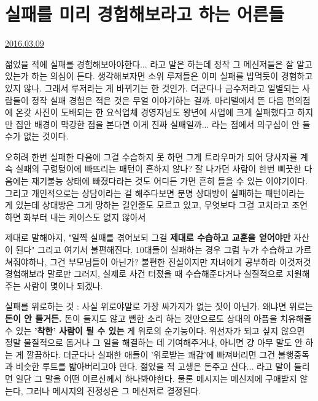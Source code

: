 \section{실패를 미리 경험해보라고 하는 어른들}
\href{https://www.kockoc.com/Apoc/670071}{2016.03.09}

\vspace{5mm}

젊었을 적에 실패를 경험해보아야한다... 라고 말은 하는데 정작 그 메신저들은 잘 알고 있는가 하는 의심이 든다.
생각해보자면 소위 루저들은 이미 실패를 밥먹듯이 경험하고 있지 않나.  그래서 루저라는 게 바뀌기는 한 것인가.
더군다나 금수저라고 일별되는 사람들이 정작 실패 경험은 적은 것은 무얼 이야기하는 걸까.
마리텔에서 뜬 다음 편의점에 온갖 사진이 도배되는 한 요식업체 경영자님도
왕년에 사업에 크게 실패했다고 하지만 집안 배경이 막강한 점을 본다면 이게 진짜 실패일까... 라는 점에서 의구심이 안 들 수가 없는 것이다.
\vspace{5mm}

오히려 한번 실패한 다음에 그걸 수습하지 못 하면 그게 트라우마가 되어 당사자를 계속 실패의 구렁텅이에 빠뜨리는 패턴이 흔하지 않나?
잘 나가던 사람이 한번 삐끗한 다음에는 재기불능 상태에 빠졌다라는 것도 어디든 가면 흔히 들을 수 있는 이야기이다.
그리고 개인적으로는 상담이라는 걸 해주다보면 분명 상대방이 실패하는 패턴이라는 게 있는데
상대방은 그게 망하는 길인줄도 모르고 있고, 무엇보다 그걸 고치라고 조언하면 화부터 내는 케이스도 없지 않아서
\vspace{5mm}

제대로 말해야지, "일찍 실패를 겪어보되 그걸 \textbf{제대로 수습하고 교훈을 얻어야만} 자산이 된다"
그리고 여기서 불편해진다. 10대들이 실패하는 경우 그럼 누가 수습하고 가르쳐줘야하나, 그건 부모님들이 아닌가?
불편한 진실이지만 자녀에게 공부하라 이것저것 경험해보라 말로만 그러지, 실제로 사건 터졌을 때 수습해준다거나
실질적으로 지원해주는 사람이 몇이나 되겠나.
\vspace{5mm}

실패를 위로하는 것 : 사실 위로야말로 가장 싸가지가 없는 짓이 아닌가. 왜냐면 위로는 \textbf{돈이 안 들거든.}
돈이 들지도 않고 뻔한 소리 하는 것만으로도 상대의 아픔을 치유해줄 수 있는 \textbf{'착한' 사람이 될 수 있는} 게 위로의 순기능이다.
위선자가 되고 싶지 않으면 정말 물질적으로 돕거나 그 일을 해결하는 데 기여해주거나, 아니면 걍 아무 말도 안 하는 게 깔끔하다.
더군다나 실패한 애들이 '위로받는 쾌감'에 빠져버리면 그건 불행중독과 비슷한 루트를 밟아버리고야 만다.
젊었을 적 고생은 돈주고 산다... 라고 말이 들리면 일단 그 말을 어떤 어르신께서 하나봐야한다.
물론 메시지는 메신저에 구애받지 않는다, 그러나 메시지의 진정성은 그 메신저로 결정된다.
\vspace{5mm}


